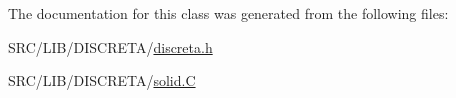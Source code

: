 The documentation for this class was generated from the following files\+:\begin{DoxyCompactItemize}
\item 
S\+R\+C/\+L\+I\+B/\+D\+I\+S\+C\+R\+E\+T\+A/\mbox{\hyperlink{discreta_8h}{discreta.\+h}}\item 
S\+R\+C/\+L\+I\+B/\+D\+I\+S\+C\+R\+E\+T\+A/\mbox{\hyperlink{solid_8_c}{solid.\+C}}\end{DoxyCompactItemize}
